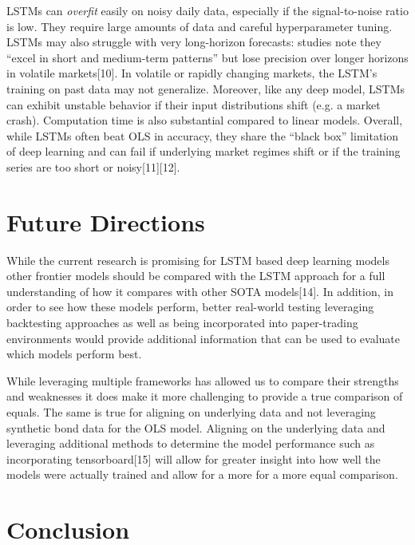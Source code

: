 \documentclass[conference]{IEEEtran}
\begin{document}
LSTMs can \textit{overfit} easily on noisy daily data, especially if the signal-to-noise ratio is low. They require large amounts of data and careful hyperparameter tuning. LSTMs may also struggle with very long-horizon forecasts: studies note they “excel in short and medium-term patterns” but lose precision over longer horizons in volatile markets[10]. In volatile or rapidly changing markets, the LSTM’s training on past data may not generalize. Moreover, like any deep model, LSTMs can exhibit unstable behavior if their input distributions shift (e.g. a market crash). Computation time is also substantial compared to linear models. Overall, while LSTMs often beat OLS in accuracy, they share the “black box” limitation of deep learning and can fail if underlying market regimes shift or if the training series are too short or noisy[11][12].

\section{Future Directions}

While the current research is promising for LSTM based deep learning models other frontier models should be compared with the LSTM approach for a full understanding of how it compares with other SOTA models[14].  In addition, in order to see how these models perform, better real-world testing leveraging backtesting approaches as well as being incorporated into paper-trading environments would provide additional information that can be used to evaluate which models perform best.

While leveraging multiple frameworks has allowed us to compare their strengths and weaknesses it does make it more challenging to provide a true comparison of equals.  The same is true for aligning on underlying data and not leveraging synthetic bond data for the OLS model.  Aligning on the underlying data and leveraging additional methods to determine the model performance such as incorporating tensorboard[15] will allow for greater insight into how well the models were actually trained and allow for a more for a more equal comparison.

\section{Conclusion}
\end{document}
